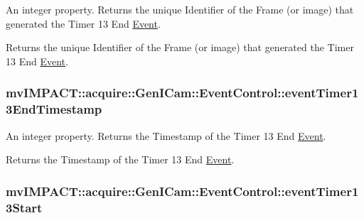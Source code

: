 An integer property. Returns the unique Identifier of the Frame (or image) that generated the Timer 13 End \hyperlink{classmv_i_m_p_a_c_t_1_1acquire_1_1_event}{Event}. 

Returns the unique Identifier of the Frame (or image) that generated the Timer 13 End \hyperlink{classmv_i_m_p_a_c_t_1_1acquire_1_1_event}{Event}. \hypertarget{classmv_i_m_p_a_c_t_1_1acquire_1_1_gen_i_cam_1_1_event_control_a10b19b959626efa201428c2417617836}{
\subsubsection[{event\+Timer13\+End\+Timestamp}]{ mv\+I\+M\+P\+A\+C\+T\+::acquire\+::\+Gen\+I\+Cam\+::\+Event\+Control\+::event\+Timer13\+End\+Timestamp}}\label{classmv_i_m_p_a_c_t_1_1acquire_1_1_gen_i_cam_1_1_event_control_a10b19b959626efa201428c2417617836}


An integer property. Returns the Timestamp of the Timer 13 End \hyperlink{classmv_i_m_p_a_c_t_1_1acquire_1_1_event}{Event}. 

Returns the Timestamp of the Timer 13 End \hyperlink{classmv_i_m_p_a_c_t_1_1acquire_1_1_event}{Event}. \hypertarget{classmv_i_m_p_a_c_t_1_1acquire_1_1_gen_i_cam_1_1_event_control_ac93d6d4734cb5d048709912c506b7dbf}{
\subsubsection[{event\+Timer13\+Start}]{ mv\+I\+M\+P\+A\+C\+T\+::acquire\+::\+Gen\+I\+Cam\+::\+Event\+Control\+::event\+Timer13\+Start}}\label{classmv_i_m_p_a_c_t_1_1acquire_1_1_gen_i_cam_1_1_event_control_ac93d6d4734cb5d048709912c506b7dbf}


